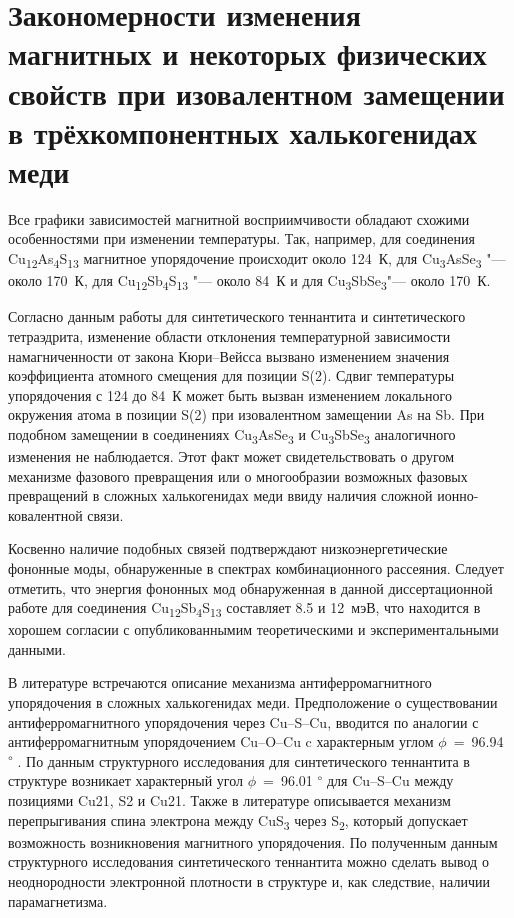 \clearpage

\newpage

\section{Закономерности изменения магнитных и некоторых физических свойств при изовалентном замещении в трёхкомпонентных халькогенидах меди} \label{sect4_4}

Все графики зависимостей магнитной восприимчивости обладают схожими особенностями при изменении температуры. Так, например, для соединения Cu\textsubscript{12}As\textsubscript{4}S\textsubscript{13} магнитное упорядочение происходит около 124~К, для Cu\textsubscript{3}AsSe\textsubscript{3} "--- около 170~К, для Cu\textsubscript{12}Sb\textsubscript{4}S\textsubscript{13}  "--- около 84~К и для Cu\textsubscript{3}SbSe\textsubscript{3}"--- около 170~К.

Согласно данным работы \cite{Nasonova2016} для синтетического теннантита и синтетического тетраэдрита, изменение области отклонения температурной зависимости намагниченности от закона Кюри--Вейсса вызвано изменением значения коэффициента атомного смещения для позиции S(2). Сдвиг температуры упорядочения с 124 до 84~К может быть вызван изменением локального окружения атома в позиции S(2) при изовалентном замещении As на Sb.
При подобном замещении в соединениях Cu\textsubscript{3}AsSe\textsubscript{3} и Cu\textsubscript{3}SbSe\textsubscript{3} аналогичного изменения не наблюдается. Этот факт может свидетельствовать о другом механизме фазового превращения или о многообразии возможных фазовых превращений в сложных халькогенидах меди ввиду наличия сложной ионно-ковалентной связи.

Косвенно наличие подобных связей подтверждают низкоэнергетические фононные моды, обнаруженные в спектрах комбинационного рассеяния. Следует отметить, что энергия фононных мод обнаруженная в данной диссертационной работе для соединения Cu\textsubscript{12}Sb\textsubscript{4}S\textsubscript{13} составляет 8.5 и 12~мэВ, что находится в хорошем согласии с опубликованнымим теоретическими\cite{Lai_2015} и экспериментальными\cite{May2016} данными.

В литературе встречаются описание механизма антиферромагнитного упорядочения в сложных халькогенидах меди. Предположение о существовании антиферромагнитного упорядочения через Cu--S--Cu, вводится по аналогии с антиферромагнитным упорядочением Cu--O--Cu\cite{Crawford1976} c характерным углом $\phi$~=~96.94\textsuperscript{ $\circ$ }. По данным структурного исследования для синтетического теннантита в структуре возникает характерный угол $\phi$~=~96.01\textsuperscript{ $\circ$ } для Cu--S--Cu между позициями Cu21, S2 и Cu21. Также в литературе описывается механизм перепрыгивания спина электрона между CuS\textsubscript{3} через S\textsubscript{2}\cite{Gainov2008,Gainov_2006}, который допускает возможность возникновения магнитного упорядочения. По полученным данным структурного исследования синтетического теннантита можно сделать вывод о неоднородности электронной плотности в структуре и, как следствие, наличии парамагнетизма.

